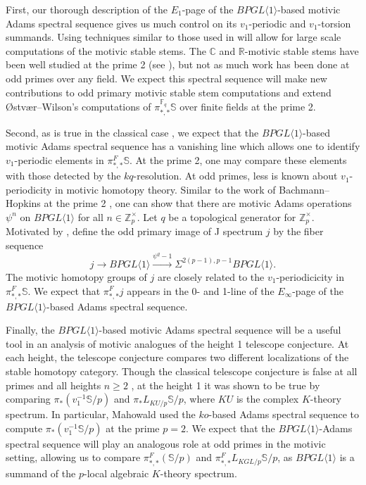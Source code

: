 \documentclass{amsart}
\theoremstyle{plain}
\numberwithin{theorem}{section}
\numberwithin{equation}{section}
\numberwithin{figure}{section}
\newcommand{\0}{\langle 0 \rangle }
\begin{document}
First, our thorough description of the $E_1$-page of the $BPGL\langle 1 \rangle$-based motivic Adams spectral sequence gives us much control on its $v_1$-periodic and $v_1$-torsion summands. Using techniques similar to those used in \cite{BBBCX} will allow for large scale computations of the motivic stable stems. The $\mathbb{C}$ and $\mathbb{R}$-motivic stable stems have been well studied at the prime 2 (see \cite{IsaWanXu23,BelIsa22}), but not as much work has been done at odd primes over any field. We expect this spectral sequence will make new contributions to odd primary motivic stable stem computations and extend \O stv\ae r--Wilson's computations of $\pi_{*,*}^{\mathbb{F}_q}\mathbb{S}$ over finite fields \cite{WO-finite} at the prime 2.

Second, as is true in the classical case \cite{Gonzalez00}, we expect that the $BPGL\langle 1 \rangle$-based motivic Adams spectral sequence has a vanishing line which allows one to identify $v_1$-periodic elements in $\pi_{*,*}^F\mathbb{S}$. At the prime 2, one may compare these elements with those detected by the $kq$-resolution. At odd primes, less is known about $v_1$-periodicity in motivic homotopy theory. Similar to the work of Bachmann--Hopkins at the prime 2 \cite{BH21}, one can show that there are motivic Adams operations $\psi^n$ on $BPGL \langle 1 \rangle$ for all $n \in \mathbb{Z}_p^\times$. Let $q$ be a topological generator for $\mathbb{Z}_p^\times$. Motivated by \cite{BruRog22}, define the odd primary image of J spectrum $j$ by the fiber sequence
\[j \to BPGL\langle 1 \rangle \xrightarrow{\psi^q-1}\Sigma^{2(p-1), p-1}BPGL\langle 1 \rangle.\]
The motivic homotopy groups of $j$ are closely related to the $v_1$-periodicicity in $\pi_{*,*}^F\mathbb{S}$. We expect that $\pi_{*,*}^Fj$ appears in the 0- and 1-line of the $E_\infty$-page of the $BPGL\langle 1 \rangle$-based Adams spectral sequence.

Finally, the $BPGL\langle 1 \rangle$-based motivic Adams spectral sequence will be a useful tool in an analysis of motivic analogues of the height 1 telescope conjecture. At each height, the telescope conjecture compares two different localizations of the stable homotopy category. Though the classical telescope conjecture is false at all primes and all heights $n \geq 2$ \cite{BHLS23}, at the height 1 it was shown to be true by comparing $\pi_*(v_1^{-1}\mathbb{S}/p)$ and $\pi_{*}L_{KU/p}\mathbb{S}/p$, where $KU$ is the complex $K$-theory spectrum\cite{Mahowald81, Miller81}. In particular, Mahowald used the $ko$-based Adams spectral sequence to compute $\pi_*(v_1^{-1}\mathbb{S}/p)$ at the prime $p=2$. We expect that the $BPGL\langle 1\rangle$-Adams spectral sequence will play an analogous role at odd primes in the motivic setting, allowing us to compare $\pi_{*,*}^F(\mathbb{S}/p)$ and $\pi_{*,*}^FL_{KGL/p}\mathbb{S}/p$, as $BPGL\langle 1 \rangle$ is a summand of the $p$-local algebraic $K$-theory spectrum.
\end{document}
